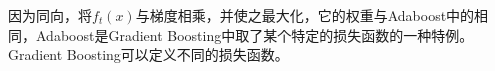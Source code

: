 \documentclass[UTF8]{ctexart} %
\begin{document}
			因为同向，将$f_t(x)$与梯度相乘，并使之最大化，它的权重与Adaboost中的相同，Adaboost是Gradient Boosting中取了某个特定的损失函数的一种特例。Gradient Boosting可以定义不同的损失函数。
			\begin{figure}[H]
			\end{figure}
			
			\begin{figure}[H]
			\end{figure}
			
			
\end{document}
